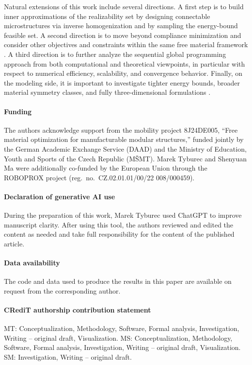 \documentclass[preprint,3p]{elsarticle}
\begin{document}
Natural extensions of this work include several directions. A first step is to build inner approximations of the realizability set by designing connectable microstructures via inverse homogenization \citep{Sigmund1994} and by sampling the energy-bound feasible set. A second direction is to move beyond compliance minimization and consider other objectives and constraints within the same free material framework \citep{Tyburec2025}. A third direction is to further analyze the sequential global programming approach from both computational and theoretical viewpoints, in particular with respect to numerical efficiency, scalability, and convergence behavior. Finally, on the modeling side, it is important to investigate tighter energy bounds, broader material symmetry classes, and fully three-dimensional formulations \citep{Burazin2023}.

\paragraph{Funding} The authors acknowledge support from the mobility project 8J24DE005, ``Free material optimization for manufacturable modular structures,'' funded jointly by the German Academic Exchange Service (DAAD) and the Ministry of Education, Youth and Sports of the Czech Republic (M\v{S}MT). Marek Tyburec and Shenyuan Ma were additionally co-funded by the European Union through the ROBOPROX project (reg.\ no.\ CZ.02.01.01/00/22 008/000459).

\paragraph{Declaration of generative AI use} During the preparation of this work, Marek Tyburec used ChatGPT to improve manuscript clarity. After using this tool, the authors reviewed and edited the content as needed and take full responsibility for the content of the published article.

\paragraph{Data availability} The code and data used to produce the results in this paper are available on request from the corresponding author.

\paragraph{CRediT authorship contribution statement} MT: Conceptualization, Methodology, Software, Formal analysis, Investigation, Writing -- original draft, Visualization. MS: Conceptualization, Methodology, Software, Formal analysis, Investigation, Writing -- original draft, Visualization. SM: Investigation, Writing -- original draft.
\end{document}
